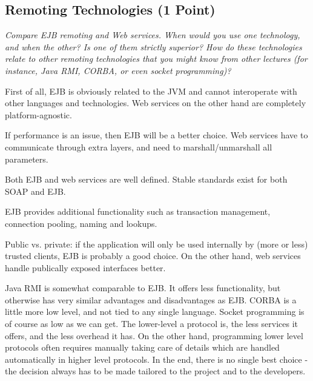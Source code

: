 \documentclass[a4paper,10pt]{article}
\begin{document}
\subsection{Remoting Technologies (1 Point)}

\emph{Compare EJB remoting and Web services. When would you use one technology, and when the other? Is
one of them strictly superior? How do these technologies relate to other remoting technologies that you
might know from other lectures (for instance, Java RMI, CORBA, or even socket programming)?}

\vspace{3mm}

First of all, EJB is obviously related to the JVM and cannot interoperate with other languages
and technologies. Web services on the other hand are completely platform-agnostic.

If performance is an issue, then EJB will be a better choice. Web services have to communicate
through extra layers, and need to marshall/unmarshall all parameters.

Both EJB and web services are well defined. Stable standards exist for both SOAP and EJB.

EJB provides additional functionality such as transaction management, connection pooling, naming and
lookups.

Public vs. private: if the application will only be used internally by (more or less) trusted clients,
EJB is probably a good choice. On the other hand, web services handle publically exposed interfaces better.

Java RMI is somewhat comparable to EJB. It offers less functionality, but otherwise has very similar
advantages and disadvantages as EJB. CORBA is a little more low level, and not tied to any single language.
Socket programming is of course as low as we can get. The lower-level a protocol is, the less services it
offers, and the less overhead it has. On the other hand, programming lower level protocols often requires
manually taking care of details which are handled automatically in higher level protocols. In the end,
there is no single best choice - the decision always has to be made tailored to the project
and to the developers.
\end{document}

